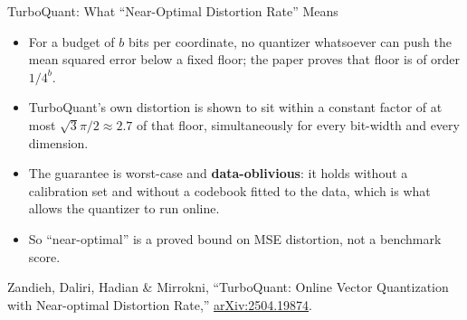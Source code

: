 \begin{frame}{TurboQuant: What ``Near-Optimal Distortion Rate'' Means}
  \begin{itemize}\itemsep0.4em
    \item[\textcolor{red}{$\blacktriangleright$}] For a budget of $b$ bits per coordinate, no quantizer whatsoever can push the mean squared error below a fixed floor; the paper proves that floor is of order $1/4^{b}$.
    \item[\textcolor{red}{$\blacktriangleright$}] TurboQuant's own distortion is shown to sit within a constant factor of at most $\sqrt{3}\pi/2 \approx 2.7$ of that floor, simultaneously for every bit-width and every dimension.
    \item[\textcolor{red}{$\blacktriangleright$}] The guarantee is worst-case and \textbf{data-oblivious}: it holds without a calibration set and without a codebook fitted to the data, which is what allows the quantizer to run online.
    \item[\textcolor{red}{$\blacktriangleright$}] So ``near-optimal'' is a proved bound on MSE distortion, not a benchmark score.
  \end{itemize}
  \vspace{0.3em}
  {\scriptsize Zandieh, Daliri, Hadian \& Mirrokni, ``TurboQuant: Online Vector Quantization with Near-optimal Distortion Rate,'' \href{https://arxiv.org/abs/2504.19874}{arXiv:2504.19874}.}
\end{frame}

